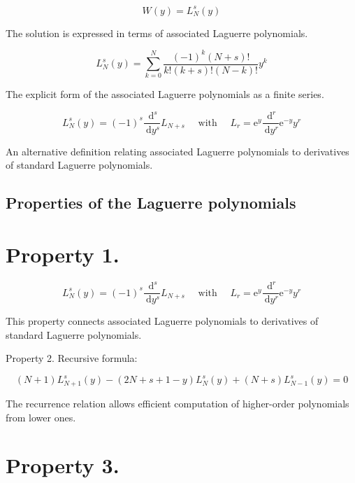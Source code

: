 \documentclass[italian]{HKNdocument}
\begin{document}
\begin{equation}
W(y)=L_{N}^{s}(y) \label{eq:9.72}
\end{equation}

The solution is expressed in terms of associated Laguerre polynomials.

\begin{equation}
L_{N}^{s}(y)=\sum_{k=0}^{N} \frac{(-1)^{k}(N+s)!}{k!(k+s)!(N-k)!} y^{k} \label{eq:9.73}
\end{equation}

The explicit form of the associated Laguerre polynomials as a finite series.

\begin{equation}
L_{N}^{s}(y)=(-1)^{s} \frac{\mathrm{~d}^{s}}{\mathrm{~d} y^{s}} L_{N+s} \quad \text { with } \quad L_{r}=\mathrm{e}^{y} \frac{\mathrm{~d}^{r}}{\mathrm{~d} y^{r}} \mathrm{e}^{-y} y^{r} \label{eq:9.74}
\end{equation}

An alternative definition relating associated Laguerre polynomials to derivatives of standard Laguerre polynomials.

\subsection{Properties of the Laguerre polynomials}
\section{Property 1.}

\begin{equation}
L_{N}^{s}(y)=(-1)^{s} \frac{\mathrm{~d}^{s}}{\mathrm{~d} y^{s}} L_{N+s} \quad \text { with } \quad L_{r}=\mathrm{e}^{y} \frac{\mathrm{~d}^{r}}{\mathrm{~d} y^{r}} \mathrm{e}^{-y} y^{r} \label{eq:9.75}
\end{equation}

This property connects associated Laguerre polynomials to derivatives of standard Laguerre polynomials.

Property 2. Recursive formula:

\begin{equation}
(N+1) L_{N+1}^{s}(y)-(2 N+s+1-y) L_{N}^{s}(y)+(N+s) L_{N-1}^{s}(y)=0 \label{eq:9.76}
\end{equation}

The recurrence relation allows efficient computation of higher-order polynomials from lower ones.

\section{Property 3.}
\end{document}
